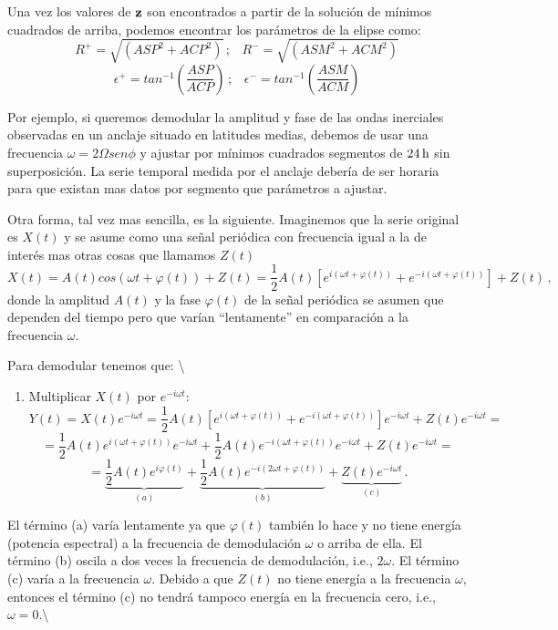 \documentclass[
]{agujournal2019}
\providecommand{\tightlist}{%
  \setlength{\itemsep}{0pt}\setlength{\parskip}{0pt}}\usepackage{longtable,booktabs,array}
\begin{document}
Una vez los valores de \({\textbf z}\) son encontrados a partir de la
solución de mínimos cuadrados de arriba, podemos encontrar los
parámetros de la elipse como:
\[R^+=\sqrt{\left( ASP^2 + ACP^2\right)}\,;\,\,\,\,\,R^-=\sqrt{\left( ASM^2 + ACM^2\right)}\]
\[\epsilon^+=tan^{-1}\left(\frac{ASP}{ACP}\right)\,;\,\,\,\,\,\epsilon^-=tan^{-1}\left(\frac{ASM}{ACM}\right)\]

Por ejemplo, si queremos demodular la amplitud y fase de las ondas
inerciales observadas en un anclaje situado en latitudes medias, debemos
de usar una frecuencia \(\omega=2\Omega sen\phi\) y ajustar por mínimos
cuadrados segmentos de \(24\,{\rm h}\) sin superposición. La serie
temporal medida por el anclaje debería de ser horaria para que existan
mas datos por segmento que parámetros a ajustar.

Otra forma, tal vez mas sencilla, es la siguiente. Imaginemos que la
serie original es \(X(t)\) y se asume como una señal periódica con
frecuencia igual a la de interés mas otras cosas que llamamos \(Z(t)\)
\[X(t)=A(t)cos\left(\omega t + \varphi(t)\right) + Z(t)= \frac{1}{2}A(t)
       \left[e^{i(\omega t + \varphi(t))} + e^{-i(\omega t + \varphi(t))} \right] + Z(t)\,,\]
donde la amplitud \(A(t)\) y la fase \(\varphi(t)\) de la señal
periódica se asumen que dependen del tiempo pero que varían
``lentamente'' en comparación a la frecuencia \(\omega\).

Para demodular tenemos que: \textbackslash{}

\begin{enumerate}
\def\labelenumi{(\arabic{enumi})}
\tightlist
\item
  Multiplicar \(X(t)\) por \(e^{-i\omega t}\):
  \[Y(t)=X(t)e^{-i\omega t}=\frac{1}{2}A(t)
     \left[e^{i(\omega t + \varphi(t))} + e^{-i(\omega t + \varphi(t))} \right]e^{-i\omega t} + Z(t)e^{-i\omega t}=\]
  \[=\frac{1}{2}A(t)e^{i(\omega t + \varphi(t))}e^{-i\omega t} + \frac{1}{2}A(t)e^{-i(\omega t + \varphi(t))}e^{-i\omega t} +
  Z(t)e^{-i\omega t}=\]
  \[=\underbrace{\frac{1}{2}A(t)e^{i\varphi(t)}}_{(a)} + \underbrace{\frac{1}{2}A(t)e^{-i(2\omega t + \varphi(t))}}_{(b)} +
  \underbrace{Z(t)e^{-i\omega t}}_{(c)}\,.\]
\end{enumerate}

El término (a) varía lentamente ya que \(\varphi(t)\) también lo hace y
no tiene energía (potencia espectral) a la frecuencia de demodulación
\(\omega\) o arriba de ella. El término (b) oscila a dos veces la
frecuencia de demodulación, i.e., \(2\omega\). El término (c) varía a la
frecuencia \(\omega\). Debido a que \(Z(t)\) no tiene energía a la
frecuencia \(\omega\), entonces el término (c) no tendrá tampoco energía
en la frecuencia cero, i.e., \(\omega=0\).\textbackslash{}
\end{document}
